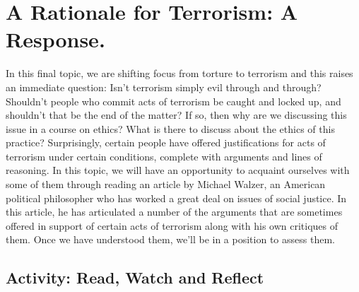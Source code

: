 \documentclass[
]{book}
\begin{document}
\hypertarget{a-rationale-for-terrorism-a-response.}{%
\section{A Rationale for Terrorism: A Response.}\label{a-rationale-for-terrorism-a-response.}}

In this final topic, we are shifting focus from torture to terrorism and this raises an immediate question: Isn't terrorism simply evil through and through? Shouldn't people who commit acts of terrorism be caught and locked up, and shouldn't that be the end of the matter? If so, then why are we discussing this issue in a course on ethics? What is there to discuss about the ethics of this practice? Surprisingly, certain people have offered justifications for acts of terrorism under certain conditions, complete with arguments and lines of reasoning. In this topic, we will have an opportunity to acquaint ourselves with some of them through reading an article by Michael Walzer, an American political philosopher who has worked a great deal on issues of social justice. In this article, he has articulated a number of the arguments that are sometimes offered in support of certain acts of terrorism along with his own critiques of them. Once we have understood them, we'll be in a position to assess them.

\hypertarget{activity-read-watch-and-reflect-13}{%
\subsection*{Activity: Read, Watch and Reflect}\label{activity-read-watch-and-reflect-13}}
\end{document}

